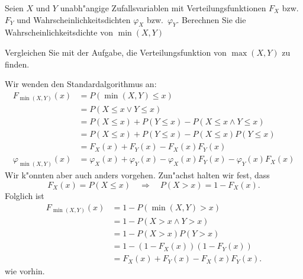 Seien $X$ und $Y$  unabh"angige Zufallsvariablen mit Verteilungsfunktionen
$F_X$ bzw.~$F_Y$ und Wahrscheinlichkeitsdichten $\varphi_X$ bzw.~$\varphi_Y$.
Berechnen Sie die Wahrscheinlichkeitsdichte von $\min(X,Y)$

\begin{hinweis}
Vergleichen Sie mit der Aufgabe, die Verteilungsfunktion
von $\operatorname{max}(X, Y)$ zu finden.
\end{hinweis}

\begin{loesung}
Wir wenden den Standardalgorithmus an:
\begin{align*}
F_{\min(X,Y)}(x)
&=
P(\min(X,Y)\le x)
\\
&=P(X\le x\vee Y\le x)
\\
&=P(X\le x) + P(Y\le x) - P(X\le x\wedge Y\le x)
\\
&=P(X\le x) + P(Y\le x) - P(X\le x)P(Y\le x)
\\
&=F_X(x)+F_Y(x)-F_X(x)F_Y(x)
\\
\varphi_{\min(X,Y)}(x)
&=
\varphi_X(x)+\varphi_Y(x)-\varphi_X(x)F_Y(x)-\varphi_Y(x)F_X(x)
\end{align*}
Wir k"onnten aber auch anders vorgehen. Zun"achst halten wir fest,
dass
\[
F_X(x)=P(X\le x)
\quad
\Rightarrow
\quad
P(X>x)=1-F_X(x).
\]
Folglich ist
\begin{align*}
F_{\min(X,Y)}(x)
&=
1-P(\min(X,Y) > x)
\\
&=
1-P(X>x\wedge Y>x)
\\
&=1-P(X>x)P(Y>x)
\\
&=1-(1-F_X(x))(1-F_Y(x))
\\
&=
F_X(x)+F_Y(x)-F_X(x)F_Y(x).
\end{align*}
wie vorhin.
\end{loesung}

